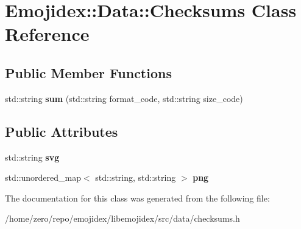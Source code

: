 \hypertarget{classEmojidex_1_1Data_1_1Checksums}{}\section{Emojidex\+:\+:Data\+:\+:Checksums Class Reference}
\label{classEmojidex_1_1Data_1_1Checksums}
\subsection*{Public Member Functions}
\begin{DoxyCompactItemize}
\item 
std\+::string {\bfseries sum} (std\+::string format\+\_\+code, std\+::string size\+\_\+code)\hypertarget{classEmojidex_1_1Data_1_1Checksums_ae8a65b3fc9c2d9fb40650c09fbbb8eca}{}\label{classEmojidex_1_1Data_1_1Checksums_ae8a65b3fc9c2d9fb40650c09fbbb8eca}

\end{DoxyCompactItemize}
\subsection*{Public Attributes}
\begin{DoxyCompactItemize}
\item 
std\+::string {\bfseries svg}\hypertarget{classEmojidex_1_1Data_1_1Checksums_a2efd7301a746504a9227cb940a66493f}{}\label{classEmojidex_1_1Data_1_1Checksums_a2efd7301a746504a9227cb940a66493f}

\item 
std\+::unordered\+\_\+map$<$ std\+::string, std\+::string $>$ {\bfseries png}\hypertarget{classEmojidex_1_1Data_1_1Checksums_a3caf0bf70d315f74fb027e1f4b880500}{}\label{classEmojidex_1_1Data_1_1Checksums_a3caf0bf70d315f74fb027e1f4b880500}

\end{DoxyCompactItemize}


The documentation for this class was generated from the following file\+:\begin{DoxyCompactItemize}
\item 
/home/zero/repo/emojidex/libemojidex/src/data/checksums.\+h\end{DoxyCompactItemize}
